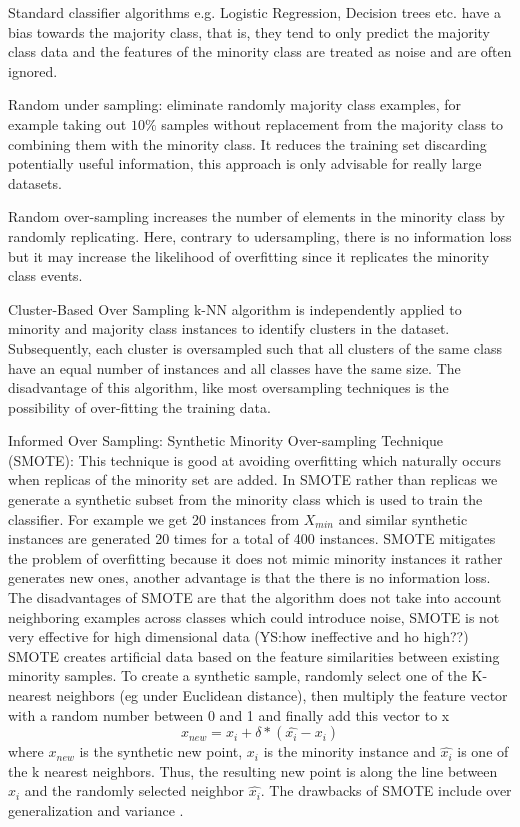 \documentclass[11pt]{article}
\theoremstyle{definition}
\theoremstyle{remark}
\begin{document}
Standard classifier algorithms e.g. Logistic Regression, Decision trees etc. have a bias towards the majority class, that is, they tend to only predict the majority class data and the features of the minority class are treated as noise and are often ignored. 


Random under sampling: eliminate randomly majority class examples, for example taking out $10\%$ samples without replacement from the majority class to combining them with the minority class. It reduces the training set discarding potentially useful information, this approach is only advisable for really large datasets.

Random over-sampling increases the number of elements in the minority class by randomly replicating. Here, contrary to udersampling, there is no information loss but it may increase the likelihood of overfitting since it replicates the minority class events.

Cluster-Based Over Sampling k-NN algorithm is independently applied to minority and majority class instances to identify clusters in the dataset. Subsequently, each cluster is oversampled such that all clusters of the same class have an equal number of instances and all classes have the same size. The disadvantage of this algorithm, like most oversampling techniques is the possibility of over-fitting the training data.  

Informed Over Sampling: Synthetic Minority Over-sampling Technique (SMOTE): This technique is good at avoiding overfitting which naturally occurs when replicas of the minority set are added. In SMOTE rather than replicas we generate a synthetic subset from the minority class which is used to train the classifier. For example we get 20 instances from $X_{min}$ and similar synthetic instances are generated 20 times for a total of 400 instances. SMOTE mitigates the problem of overfitting because it does not mimic minority instances it rather generates new ones, another advantage is that the there is no information loss.
The disadvantages of SMOTE are that the algorithm does not take into account neighboring examples across classes which could introduce noise, SMOTE is not very effective for high dimensional data (YS:how ineffective and ho high??)
SMOTE creates artificial data based on the feature similarities between existing minority samples. To create a synthetic sample, randomly select one of the K-nearest neighbors (eg under Euclidean distance), then multiply the feature vector with a random number between 0 and 1 and finally add this vector to x
\begin{equation}
x_{new} =  x_i + \delta * (\hat{x_i} - x_i)
\end{equation}
where $x_{new}$ is the synthetic new point, $x_i$ is the minority instance and $\hat{x_i}$ is one of the k nearest neighbors. Thus, the resulting new point is along the line between $x_i$ and the randomly selected neighbor $\hat{x_i}$. The drawbacks of SMOTE include over generalization and variance \cite{wang2004imbalanced}.
\end{document}
